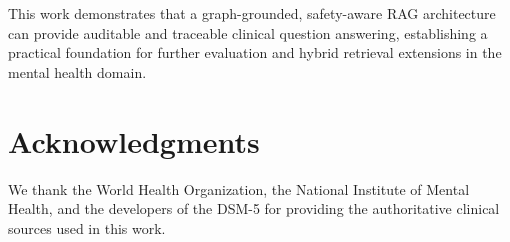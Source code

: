 \documentclass[12pt,a4paper]{article}
\begin{document}
This work demonstrates that a graph-grounded, safety-aware RAG architecture can provide auditable and traceable clinical question answering, establishing a practical foundation for further evaluation and hybrid retrieval extensions in the mental health domain.

\section*{Acknowledgments}

We thank the World Health Organization, the National Institute of Mental Health, and the developers of the DSM-5 for providing the authoritative clinical sources used in this work.

\clearpage


\end{document}
